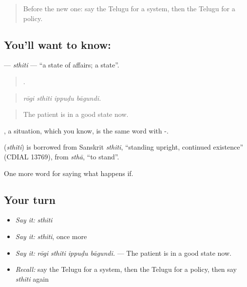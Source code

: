 \label{lesson:TE-C434-sthiti}



\begin{quote}
Before the new one: say the Telugu for a system, then the Telugu for a policy.
\end{quote}

\subsection*{You'll want to know: }
\textbf{} — \emph{sthiti} — \textquotedblleft{}a state of affairs; a state\textquotedblright{}.

\begin{quote}
   .
\end{quote}

\begin{quote}
\emph{rōgi sthiti ippuḍu bāgundi.}
\end{quote}

\begin{quote}
The patient is in a good state now.
\end{quote}

, a situation, which you know, is the same word with -.

\begin{cousinweb}
\textbf{} (\emph{sthiti}) is borrowed from Sanskrit \emph{sthiti}, \textquotedblleft{}standing upright, continued existence\textquotedblright{} (CDIAL 13769), from \emph{sthā}, \textquotedblleft{}to stand\textquotedblright{}.
\end{cousinweb}

\begin{grammarlens}[title={What you've built}]
One more word for saying what happens if.
\end{grammarlens}

\subsection*{Your turn}
\begin{itemize}
\raggedright
  \item \emph{Say it:} \emph{sthiti}
  \item \emph{Say it:} \emph{sthiti}, once more
  \item \emph{Say it:} \emph{rōgi sthiti ippuḍu bāgundi.} — The patient is in a good state now.
  \item \emph{Recall:} say the Telugu for a system, then the Telugu for a policy, then say \emph{sthiti} again
\end{itemize}


